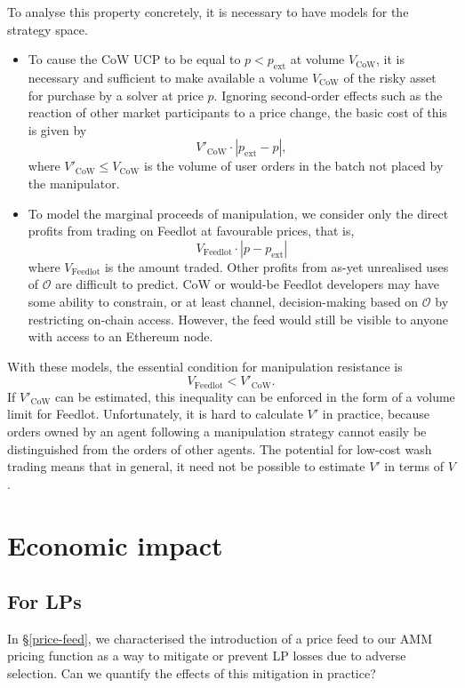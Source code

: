 \documentclass[a4paper,10pt]{article}
\theoremstyle{remark}
\newcommand \oracle {\mathcal{O}}
\begin{document}
To analyse this property concretely, it is necessary to have models for the strategy space.
\begin{itemize}
  \item 
    To cause the CoW UCP to be equal to $p<p_\mathrm{ext}$ at volume $V_\mathrm{CoW}$, it is necessary and sufficient to make available a volume $V_\mathrm{CoW}$ of the risky asset for purchase by a solver at price $p$.
    Ignoring second-order effects such as the reaction of other market participants to a price change, the basic cost of this is given by
    \begin{equation}
    \label{cost-of-manipulation}
      V'_\mathrm{CoW}\cdot |p_\mathrm{ext}-p|,
    \end{equation}
    where $V'_\mathrm{CoW}\leq V_\mathrm{CoW}$ is the volume of user orders in the batch not placed by the manipulator.
    
  \item 
    To model the marginal proceeds of manipulation, we consider only the direct profits from trading on Feedlot at favourable prices, that is,
    \[
      V_\mathrm{Feedlot}\cdot\left|p-p_\mathrm{ext}\right|
    \]
    where $V_\mathrm{Feedlot}$ is the amount traded.
    Other profits from as-yet unrealised uses of $\oracle$ are difficult to predict.
    CoW or would-be Feedlot developers may have some ability to constrain, or at least channel, decision-making based on $\oracle$ by restricting on-chain access.
    However, the feed would still be visible to anyone with access to an Ethereum node.
    
\end{itemize}
With these models, the essential condition for manipulation resistance is
\[
  V_\mathrm{Feedlot} < V'_\mathrm{CoW}.
\]
If $V'_\mathrm{CoW}$ can be estimated, this inequality can be enforced in the form of a volume limit for Feedlot.
%
Unfortunately, it is hard to calculate $V'$ in practice, because orders owned by an agent following a manipulation strategy cannot easily be distinguished from the orders of other agents.
%
The potential for low-cost wash trading means that in general, it need not be possible to estimate $V'$ in terms of $V$.

\section{Economic impact}

\subsection{For LPs}
In \S\ref{price-feed}, we characterised the introduction of a price feed to our AMM pricing function as a way to mitigate or prevent LP losses due to adverse selection.
%
Can we quantify the effects of this mitigation in practice?
\end{document}
